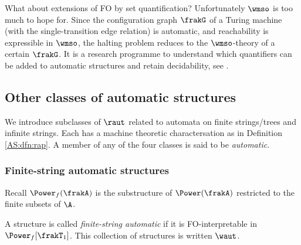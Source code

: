 What about extensions of FO by set quantification?  Unfortunately $\wmso$ is
too much to hope for.  Since the configuration graph $\frakG$ of a Turing machine (with the
single-transition edge relation) is automatic, and reachability
is expressible in $\wmso$, the halting problem reduces to the $\wmso$-theory of a certain $\frakG$. It is a research programme to understand
which quantifiers can be added to automatic structures and retain decidability, see \cite{KuLo08,Rubi04}. 


\subsection{Other classes of automatic structures}

We introduce subclasses of $\raut$ related to automata on finite strings/trees and infinite strings. 
Each has a machine theoretic charactersation as in Definition \ref{AS:dfn:rap}.
A member of any of the four classes is said to be {\em automatic}. 

\subsubsection*{Finite-string automatic structures}

Recall  $\Power_f(\frakA)$ is the substructure of $\Power(\frakA)$ restricted to the finite subsets of $\A$.

\begin{definition} 
A structure is called {\em finite-string automatic} if it is FO-interpretable in $\Power_f[\frakT_1]$. This collection of structures is written $\waut$.
\end{definition}

